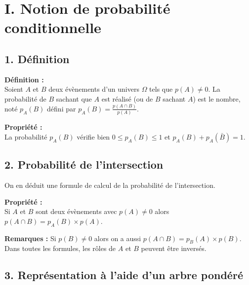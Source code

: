 \documentclass[11pt,a4paper]{article}
\title{\doctitre}
\author{\docniveau \\ \doctheme\text{ - }\doctype}
\date{}
\begin{document}
\maketitle
\pagestyle{custom}
\thispagestyle{custom}

\section*{I. Notion de probabilité conditionnelle}

\subsection*{1. Définition}

\begin{mdframed}[style=definitionStyle]
  \textbf{Définition :} ~\\
  Soient $A$ et $B$ deux évènements d'un univers $\Omega$ tels que $p(A)\not= 0$.
  La probabilité de $B$ sachant que $A$ est réalisé (ou de $B$ sachant $A$) est le nombre, noté $p_A(B)$ défini par $\displaystyle{}p_A(B)=\frac{p(A\cap B)}{p(A)}$.
\end{mdframed}

\begin{mdframed}[style=proprieteStyle]
  \textbf{Propriété :} ~\\
  La probabilité $p_A(B)$ vérifie bien $0\leq p_A(B)\leq1$ et $p_A(B)+p_A(\bar B)=1$.
\end{mdframed}

\subsection*{2. Probabilité de l'intersection}

On en déduit une formule de calcul de la probabilité de l'intersection.

\begin{mdframed}[style=proprieteStyle]
  \textbf{Propriété :} ~\\
  Si $A$ et $B$ sont deux évènements avec $p(A)\not=0$ alors $p(A\cap B)=p_A(B)\times p(A)$.
\end{mdframed}

\textbf{Remarques :} Si $p(B)\not=0$ alors on a aussi $p(A\cap B)=p_B(A)\times p(B)$. Dans toutes les formules, les rôles de $A$ et $B$ peuvent être inversés.

\subsection*{3. Représentation à l'aide d'un arbre pondéré}
\end{document}
